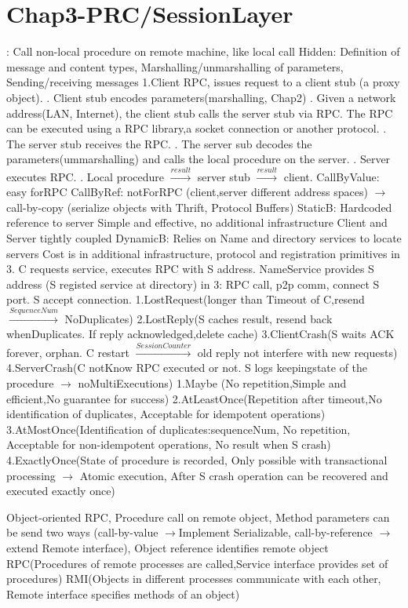 \section{Chap3-PRC/SessionLayer}
: Call non-local procedure on remote machine, like local call
\textbar Hidden: Definition of message and content types, Marshalling/unmarshalling of parameters, Sending/receiving messages
1.Client RPC, issues request to a client stub (a proxy object).
. Client stub encodes parameters(marshalling, Chap2)
. Given a network address(LAN, Internet), the client stub calls the server stub via RPC. 
The RPC can be executed using a RPC library,a socket connection or another protocol.
. The server stub receives the RPC.
. The server sub decodes the parameters(ummarshalling) and calls the local procedure on the server.
. Server executes RPC.
. Local procedure $\overset{result}{\rightarrow}$ server stub $\overset{result}{\rightarrow}$ client.
CallByValue: easy forRPC
\textbar CallByRef: notForRPC (client,server different address spaces) $\rightarrow$ call-by-copy (serialize objects with Thrift, Protocol
Buffers)
StaticB: Hardcoded reference to server 
\textbar Simple and effective, no additional infrastructure
\textbar Client and Server tightly coupled
\textbar \textbar 
DynamicB:
Relies on Name and directory services to locate servers
\textbar Cost is in additional infrastructure, protocol and registration primitives
\textbar in 3. C requests service, executes RPC with S address. NameService provides S address (S registed service at directory)
in 3: RPC call, p2p comm, connect S port. S accept connection.
1.LostRequest(longer than Timeout of C,resend $\overset{SequenceNum}{\rightarrow}$ NoDuplicates)
\textbar 2.LostReply(S caches result, resend back whenDuplicates. If reply acknowledged,delete cache)
\textbar 3.ClientCrash(S waits ACK forever, orphan. 
C restart $\overset{SessionCounter}{\rightarrow}$  old reply not interfere with new requests)
\textbar 4.ServerCrash(C notKnow RPC executed or not. S logs keepingstate of the procedure $\rightarrow$ noMultiExecutions)
1.Maybe (No repetition,Simple and efficient,No guarantee for success)
\textbar 2.AtLeastOnce(Repetition after timeout,No identification of duplicates, Acceptable for idempotent operations)
\textbar 3.AtMostOnce(Identification of duplicates:sequenceNum, No repetition, Acceptable for non-idempotent operations, No result when S crash)
\textbar 4.ExactlyOnce(State of procedure is recorded, 
Only possible with transactional processing $\rightarrow$ Atomic execution, After S crash operation can be recovered and executed exactly once)

 Object-oriented RPC, Procedure call on remote object, Method parameters can be send two ways
(call-by-value $\rightarrow$Implement Serializable, call-by-reference $\rightarrow$ extend Remote interface),
Object reference identifies remote object
RPC(Procedures of remote processes are called,Service interface provides set of procedures)
\textbar RMI(Objects in different processes communicate with each other, Remote interface specifies methods of an object)
